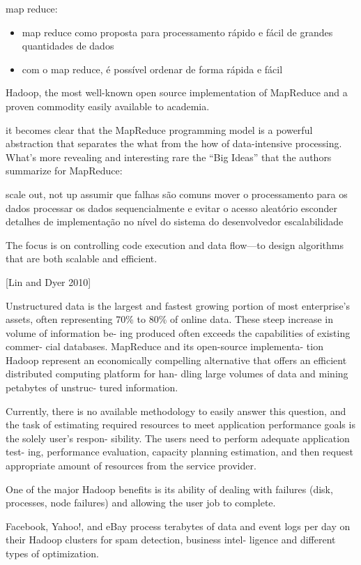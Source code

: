 map reduce:
\begin{itemize}
\item map reduce como proposta para processamento rápido e fácil de grandes quantidades de dados
\item com o map reduce, é possível ordenar de forma rápida e fácil
\end{itemize}

Hadoop, the most well-known open source implementation of MapReduce and a proven commodity easily available to academia.

it becomes clear that the MapReduce programming model is a powerful abstraction that separates the what from the how of data-intensive processing. What’s more revealing and interesting rare the “Big Ideas” that the authors summarize for MapReduce:

scale out, not up
assumir que falhas são comuns 
mover o processamento para os dados
processar os dados sequencialmente e evitar o acesso aleatório
esconder detalhes de implementação no nível do sistema do desenvolvedor
escalabilidade 


 The focus is on controlling code execution and data flow—to design algorithms that are both scalable and efficient. 
 
 [Lin and Dyer 2010]
 
 
 Unstructured data is the largest and fastest growing portion of most enterprise’s assets, often representing 70\% to 80\% of online data. These steep increase in volume of information be- ing produced often exceeds the capabilities of existing commer- cial databases. MapReduce and its open-source implementa- tion Hadoop represent an economically compelling alternative that offers an efficient distributed computing platform for han- dling large volumes of data and mining petabytes of unstruc- tured information.
 
 Currently, there is no available methodology to easily answer this question, and the task of estimating required resources to meet application performance goals is the solely user’s respon- sibility. The users need to perform adequate application test- ing, performance evaluation, capacity planning estimation, and then request appropriate amount of resources from the service provider. 

 One of the major Hadoop benefits is its ability of dealing with failures (disk, processes, node failures) and allowing the user job to complete. 


Facebook, Yahoo!, and eBay process terabytes of data and event logs per day on their Hadoop clusters for spam detection, business intel- ligence and different types of optimization. 

